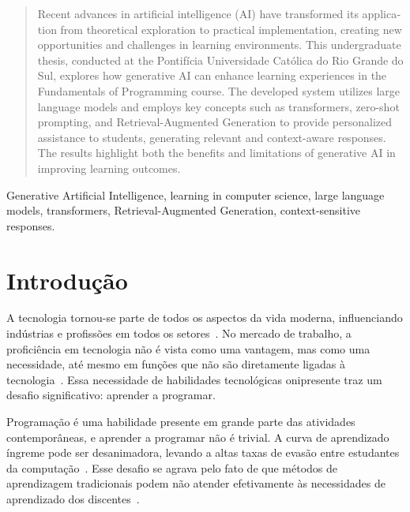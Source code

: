 \documentclass[journal]{IEEEtran}
\begin{document}
\begin{otherlanguage}{english}
\begin{abstract}
Recent advances in artificial intelligence (AI) have transformed its application from theoretical exploration to practical implementation, creating new opportunities and challenges in learning environments.
This undergraduate thesis, conducted at the Pontifícia Universidade Católica do Rio Grande do Sul, explores how generative AI can enhance learning experiences in the Fundamentals of Programming course.
The developed system utilizes large language models and employs key concepts such as transformers, zero-shot prompting, and Retrieval-Augmented Generation to provide personalized assistance to students, generating relevant and context-aware responses.
The results highlight both the benefits and limitations of generative AI in improving learning outcomes.
\end{abstract}
\end{otherlanguage}

\renewcommand{\IEEEkeywordsname}{Key-words}
\begin{IEEEkeywords}
    Generative Artificial Intelligence, learning in computer science, large language models, transformers, Retrieval-Augmented Generation, context-sensitive responses.
\end{IEEEkeywords}

\section{Introdução}

\noindent%
A tecnologia tornou-se parte de todos os aspectos da vida moderna, influenciando indústrias e profissões em todos os setores~\cite{wef2019schools}.
No mercado de trabalho, a proficiência em tecnologia não é vista como uma vantagem, mas como uma necessidade, até mesmo em funções que não são diretamente ligadas à tecnologia~\cite{googlestartups2023panorama}.
Essa necessidade de habilidades tecnológicas onipresente traz um desafio significativo: aprender a programar.

Programação é uma habilidade presente em grande parte das atividades contemporâneas, e aprender a programar não é trivial.
A curva de aprendizado íngreme pode ser desanimadora, levando a altas taxas de evasão entre estudantes da computação~\cite{hoed2017analise,alvim2024evasao}.
Esse desafio se agrava pelo fato de que métodos de aprendizagem tradicionais podem não atender efetivamente às necessidades de aprendizado dos discentes~\cite{giraffa2023ensino,kasneci2023chatgpt,guzdial2015learner,kinnunen2006students,takacs2022}.
\end{document}
